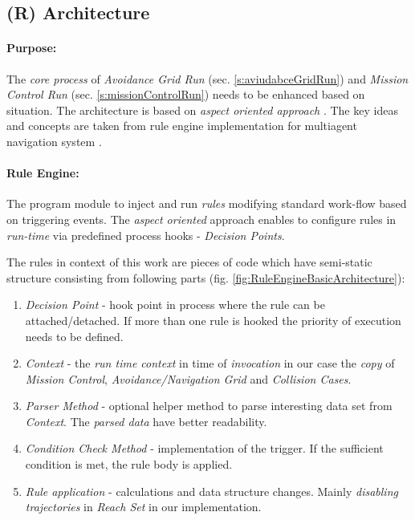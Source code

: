 \subsection{(R) Architecture}\label{s:RuleEngineArchitecture}

\paragraph{Purpose:} The \emph{core process} of \emph{Avoidance Grid Run} (sec. \ref{s:aviudabceGridRun}) and \emph{Mission Control Run} (sec. \ref{s:missionControlRun}) needs to be enhanced based on  situation. The architecture is based on \emph{aspect oriented approach} \cite{hill2003jess}. The key ideas and concepts are taken from rule engine implementation for multiagent  navigation system \cite{seyboth2013event}.

\paragraph{Rule Engine:} The program module to inject and run \emph{rules} modifying standard work-flow based on  triggering events. The \emph{aspect oriented} approach enables to configure rules in \emph{run-time} via predefined process hooks - \emph{Decision Points}. 

The rules in context of this work are pieces of code which have semi-static structure consisting from following parts (fig. \ref{fig:RuleEngineBasicArchitecture}):

\begin{enumerate}
    \item \emph{Decision Point} - hook point in process where the rule can be attached/detached. If more than one rule is hooked the priority of execution needs to be defined. 
    
    \item \emph{Context} - the \emph{run time context} in time of \emph{invocation} in our case the \emph{copy} of \emph{Mission Control}, \emph{Avoidance/Navigation Grid} and \emph{Collision Cases}.
    
    \item \emph{Parser Method} - optional helper method to parse interesting data set from \emph{Context}. The \emph{parsed data} have better readability.
    
    \item \emph{Condition Check Method} - implementation of the trigger. If the sufficient condition is met, the rule body is applied.
    
    \item \emph{Rule application} - calculations and data structure changes. Mainly \emph{disabling trajectories} in \emph{Reach Set} in our implementation.     
\end{enumerate}


